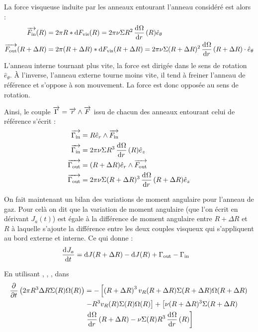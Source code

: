 La force visqueuse induite par les anneaux entourant l'anneau considéré est alors : 
\begin{subequations}
\begin{align}
{\overrightarrow{F_\text{in}}}(R) &= 2\pi R * \operatorname{d \!} F_\text{vis}(R) = 2\pi\nu \Sigma R^2 \mathinner{ \dfrac{\operatorname{d \!}{^{}}\Omega}{\operatorname{d \!}{{r}^{}}} }(R) \hat{e}_\theta\\
{\overrightarrow{F_\text{out}}}(R+\Delta R) &= 2\pi (R+\Delta R) * \operatorname{d \!} F_\text{vis}(R+\Delta R) = 2\pi\nu \Sigma (R+\Delta R)^2 \mathinner{ \dfrac{\operatorname{d \!}{^{}}\Omega}{\operatorname{d \!}{{r}^{}}} }(R+\Delta R) \cdot \hat{e}_\theta
\end{align}
\end{subequations}
L'anneau interne tournant plus vite, la force est dirigée dans le sens de rotation $\hat{e}_\theta$. À l'inverse, l'anneau externe tourne moins vite, il tend à freiner l'anneau de référence et s'oppose à son mouvement. La force est donc opposée au sens de rotation.

\bigskip

Ainsi, le couple ${\overrightarrow{\Gamma}}={\overrightarrow{r}}\wedge{\overrightarrow{F}}$ issu de chacun des anneaux entourant celui de référence s'écrit :
\begin{subequations}
\begin{align}
\vect{\Gamma_\text{in}} &= R\hat{e}_r\wedge\vect{F_\text{in}}\nonumber\\
\vect{\Gamma_\text{in}} &= 2\pi\nu \Sigma R^3 \dod{\Omega}{r}(R) \hat{e}_z\label{eq:G_in}\\
\vect{\Gamma_\text{out}} &= (R+\Delta R)\hat{e}_r\wedge\vect{F_\text{out}}\nonumber\\
\vect{\Gamma_\text{out}} &= 2\pi\nu \Sigma (R+\Delta R)^3 \dod{\Omega}{r}(R+\Delta R) \hat{e}_z\label{eq:G_out}
\end{align}\label{eq:J_torques}
\end{subequations}

\bigskip

On fait maintenant un bilan des variations de moment angulaire pour l'anneau de gaz. Pour celà on dit que la variation de moment angulaire (que l'on écrit en dérivant $J_a(t)$) est égale à la différence de moment angulaire entre $R+\Delta R$ et $R$ à laquelle s'ajoute la différence entre les deux couples visqueux qui s'appliquent au bord externe et interne. Ce qui donne : 
\begin{align}
\mathinner{ \dfrac{\operatorname{d \!}{^{}}J_a}{\operatorname{d \!}{{t}^{}}} } &= \operatorname{d \!} J(R+\Delta R) - \operatorname{d \!} J(R) + \Gamma_\text{out} - \Gamma_\text{in}\label{eq:cons_J_a}
\end{align}

En utilisant , , , dans 
\begin{align*}
\begin{split}
\mathinner{ \dfrac{\partial{^{}}}{\partial{{t}^{}}} }\left(2\pi R^3 \Delta R \Sigma(R)\Omega(R)\right) &= -\left[\left(R+\Delta R\right)^3v_R(R+\Delta R) \Sigma(R+\Delta R) \Omega(R+\Delta R)\right.\\
&\left. - R^3 v_R(R) \Sigma(R) \Omega(R)\right] + \left[\nu(R+\Delta R)^3\Sigma(R+\Delta R)\right.\\
&\left. \mathinner{ \dfrac{\operatorname{d \!}{^{}}\Omega}{\operatorname{d \!}{{r}^{}}} }(R+\Delta R)-\nu \Sigma(R) R^3 \mathinner{ \dfrac{\operatorname{d \!}{^{}}\Omega}{\operatorname{d \!}{{r}^{}}} }(R)\right]
\end{split}
\end{align*}



